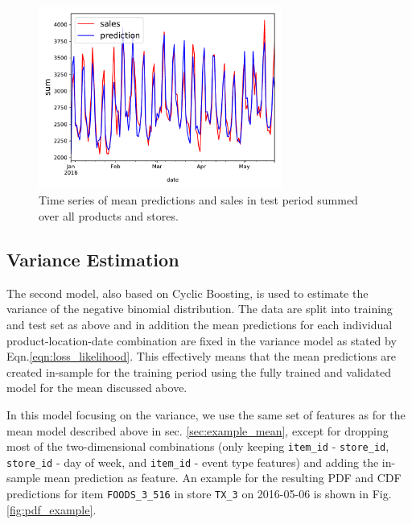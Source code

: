 \documentclass[BCOR=1mm, DIV=calc,10pt,
twoside=true,
twocolumn,
headings=normal]{scrartcl}
\newcommand{\fig}{Fig.}
\newcommand{\eqn}{Eqn.}
\begin{document}
\begin{figure}
\begin{center}
\includegraphics[width=8cm]{../figures/ts_full}
\caption{\label{fig:mean_prediction} Time series of mean predictions and sales in test period summed over all products and stores.}
\end{center}
\end{figure}

\subsection{Variance Estimation}

The second model, also based on Cyclic Boosting, is used to estimate the variance of the negative binomial distribution. The data are split into training and test set as above and in addition the mean predictions for each individual product-location-date combination are fixed in the variance model as stated by \eqn \eqref{eqn:loss_likelihood}. This effectively means that the mean predictions are created in-sample for the training period using the fully trained and validated model for the mean discussed above.

\noindent
In this model focusing on the variance, we use the same set of features as for the mean model described above in sec. \ref{sec:example_mean}, except for dropping most of the two-dimensional combinations (only keeping \texttt{item\_id} - \texttt{store\_id}, \texttt{store\_id} - day of week, and \texttt{item\_id} - event type features) and adding the in-sample mean prediction as feature. An example for the resulting PDF and CDF predictions for item \texttt{FOODS\_3\_516} in store \texttt{TX\_3} on 2016-05-06 is shown in \fig \ref{fig:pdf_example}.
\end{document}
